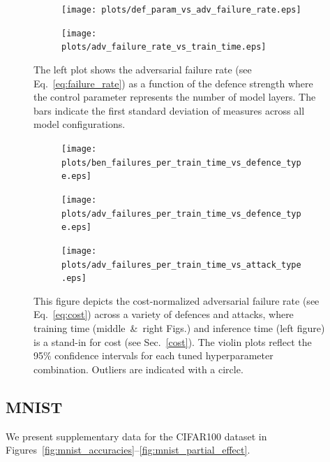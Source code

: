 \begin{figure}[!h]
    \centering
    \begin{subfigure}
        \centering
        \texttt{[image: plots/def\_param\_vs\_adv\_failure\_rate.eps]}
    \end{subfigure}
    \begin{subfigure}
        \centering
        \texttt{[image: plots/adv\_failure\_rate\_vs\_train\_time.eps]}
    \end{subfigure}
    \caption{The left plot shows the adversarial failure rate (see Eq.~\ref{eq:failure_rate}) as a function of the defence strength where the control parameter represents the number of model layers. The bars indicate the first standard deviation of measures across all model configurations.}
    \label{fig:failure_rate}
\end{figure}

\begin{figure}[!h]
    \centering
    \begin{subfigure}
        \centering
        \texttt{[image: plots/ben\_failures\_per\_train\_time\_vs\_defence\_type.eps]}
    \end{subfigure}
    \begin{subfigure}
        \centering
        \texttt{[image: plots/adv\_failures\_per\_train\_time\_vs\_defence\_type.eps]}
    \end{subfigure}
    \begin{subfigure}
        \centering
        \texttt{[image: plots/adv\_failures\_per\_train\_time\_vs\_attack\_type.eps]}
    \end{subfigure}
    \caption{This figure depicts the cost-normalized adversarial failure rate (see Eq.~\ref{eq:cost}) across a variety of defences and attacks, where training time (middle~\&~right Figs.) and inference time (left figure) is a stand-in for cost (see Sec.~\ref{cost}). The violin plots reflect the 95\% confidence intervals for each tuned hyperparameter combination. Outliers are indicated with a circle.}
    \label{fig:failures_per_train_time}
\end{figure}



\clearpage
\subsection{MNIST}
We present supplementary data for the CIFAR100 dataset in Figures~\ref{fig:mnist_accuracies}--\ref{fig:mnist_partial_effect}.

